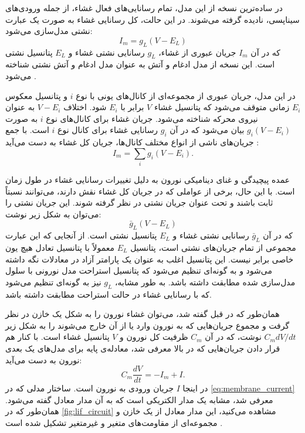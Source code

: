 در ساده‌ترین نسخه از این مدل، تمام رسانایی‌های فعال غشاء، از جمله ورودی‌های سیناپسی، نادیده گرفته می‌شوند.
در این حالت، کل رسانایی غشاء به صورت یک عبارت نشتی مدل‌سازی می‌شود:
\begin{equation} \label{eq:leaky_current}
    I_{m} = g_{L} (V - E_{L})
\end{equation}
که در آن
\( I_{m} \)
جریان عبوری از غشاء،
\( g_{L} \)
رسانایی نشتی غشاء و
\( E_{L} \)
پتانسیل نشتی است.
این نسخه از مدل ادغام و آتش به عنوان مدل ادغام و آتش نشتی شناخته می‌شود
\cite{dayan2001}.

در این مدل، جریان عبوری از مجموعه‌ای از کانال‌های یونی با نوع
\( i \)
و پتانسیل معکوس
\( E_{i} \)
زمانی متوقف می‌شود که پتانسیل غشاء
\( V \)
برابر با
\( E_{i} \)
شود.
اختلاف
\( V - E_{i} \)
به عنوان نیروی محرکه شناخته می‌شود.
جریان غشاء برای کانال‌های نوع
\( i \)
به صورت
\( g_{i} (V - E_{i}) \)
بیان می‌شود
که در آن
\( g_{i} \)
رسانایی غشاء برای کانال نوع
\( i \)
است.
با جمع جریان‌های ناشی از انواع مختلف کانال‌ها، جریان کل غشاء به دست می‌آید
\cite{dayan2001}:
\begin{equation} \label{eq:channel_current}
    I_{m} = \sum_{i} g_{i} (V - E_{i}).
\end{equation}

عمده پیچیدگی و غنای دینامیکی نورون به دلیل تغییرات رسانایی غشاء در طول زمان است.
با این حال، برخی از عواملی که در جریان کل غشاء نقش دارند، می‌توانند نسبتاً ثابت باشند و تحت عنوان جریان نشتی در نظر گرفته شوند.
این جریان نشتی را می‌توان به شکل زیر نوشت:
\[ \bar{g}_{L} (V - E_{L}) \]
که در آن
\( \bar{g}_{L} \)
رسانایی نشتی غشاء و
\( E_{L} \)
پتانسیل نشتی است.
از آنجایی که این عبارت مجموعی از تمام جریان‌های نشتی است، پتانسیل
\( E_{L} \)
معمولاً با پتانسیل تعادل هیچ یون خاصی برابر نیست.
این پتانسیل اغلب به عنوان یک پارامتر آزاد در معادلات نگه داشته می‌شود و به گونه‌ای تنظیم می‌شود که پتانسیل استراحت مدل نورونی با سلول مدل‌سازی شده مطابقت داشته باشد.
به طور مشابه،
\( g_{L} \)
نیز به گونه‌ای تنظیم می‌شود که با رسانایی غشاء در حالت استراحت مطابقت داشته باشد.

همان‌طور که در قبل گفته شد، می‌توان غشاء نورون را به شکل یک خازن در نظر گرفت و مجموع جریان‌هایی که به نورون وارد یا از آن خارج می‌شوند را به شکل زیر
\( C_{m} dV / dt \)
نوشت،
که در آن
\( C_{m} \)
ظرفیت کل نورون و
\( V \)
پتانسیل غشاء است.
با کنار هم قرار دادن جریان‌هایی که در بالا معرفی شد، معادله‌ی پایه برای مدل‌های یک بعدی نورون به دست می‌آید:
\begin{equation} \label{eq:membrane_current}
    C_{m} \frac{dV}{dt} = -I_{m} + I.
\end{equation}
در اینجا
\( I \)
جریان ورودی به نورون است.
ساختار مدلی که در
\autoref{eq:membrane_current}
معرفی شد، مشابه یک مدار الکتریکی است که به آن مدار معادل گفته می‌شود.
همان‌طور که در
\autoref{fig:lif_circuit}
مشاهده می‌کنید، این مدار معادل از یک خازن و مجموعه‌ای از مقاومت‌های متغیر و غیرمتغیر تشکیل شده است
\cite{dayan2001}.

